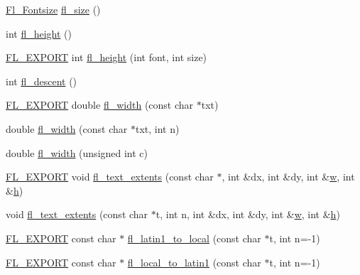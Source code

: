 \begin{DoxyCompactItemize}
\hyperlink{_enumerations_8_h_ad58927f5c691454480f7cd28362502f1}{Fl\+\_\+\+Fontsize} \hyperlink{group__fl__attributes_ga15b0cb282ba6d148f095647731f167b2}{fl\+\_\+size} ()
\item 
int \hyperlink{group__fl__attributes_gac4acb828270adf35bf1d8fc06051f938}{fl\+\_\+height} ()
\item 
\hyperlink{_fl___export_8_h_aa9ba29a18aee9d738370a06eeb4470fc}{F\+L\+\_\+\+E\+X\+P\+O\+RT} int \hyperlink{group__fl__attributes_ga287690bb893d1cc57a5010d59b2da8c9}{fl\+\_\+height} (int font, int size)
\item 
int \hyperlink{group__fl__attributes_ga080e029f6b6fe5e6bf527bbfd890317d}{fl\+\_\+descent} ()
\item 
\hyperlink{_fl___export_8_h_aa9ba29a18aee9d738370a06eeb4470fc}{F\+L\+\_\+\+E\+X\+P\+O\+RT} double \hyperlink{group__fl__attributes_ga92c762ce2fc7fa891bac6b7590f967bd}{fl\+\_\+width} (const char $\ast$txt)
\item 
double \hyperlink{group__fl__attributes_gae491dc82c611608435ed434e368ef668}{fl\+\_\+width} (const char $\ast$txt, int n)
\item 
double \hyperlink{group__fl__attributes_ga4a5b5e4a977299acdc7fcbd3c8a700b5}{fl\+\_\+width} (unsigned int c)
\item 
\hyperlink{_fl___export_8_h_aa9ba29a18aee9d738370a06eeb4470fc}{F\+L\+\_\+\+E\+X\+P\+O\+RT} void \hyperlink{group__fl__attributes_ga14cb75a92b6cdd576f9512b38a208f8b}{fl\+\_\+text\+\_\+extents} (const char $\ast$, int \&dx, int \&dy, int \&\hyperlink{forms_8_h_aac374e320caaadeca4874add33b62af2}{w}, int \&\hyperlink{forms_8_h_a7e427ba5b307f9068129699250690066}{h})
\item 
void \hyperlink{group__fl__attributes_gaa52f1ed8201b9d89c2b2edbaed80e907}{fl\+\_\+text\+\_\+extents} (const char $\ast$t, int n, int \&dx, int \&dy, int \&\hyperlink{forms_8_h_aac374e320caaadeca4874add33b62af2}{w}, int \&\hyperlink{forms_8_h_a7e427ba5b307f9068129699250690066}{h})
\item 
\hyperlink{_fl___export_8_h_aa9ba29a18aee9d738370a06eeb4470fc}{F\+L\+\_\+\+E\+X\+P\+O\+RT} const char $\ast$ \hyperlink{group__fl__attributes_ga47015273468749763dcdd97e2aef2c52}{fl\+\_\+latin1\+\_\+to\+\_\+local} (const char $\ast$t, int n=-\/1)
\item 
\hyperlink{_fl___export_8_h_aa9ba29a18aee9d738370a06eeb4470fc}{F\+L\+\_\+\+E\+X\+P\+O\+RT} const char $\ast$ \hyperlink{group__fl__attributes_gab8a87db2004482954fc81a8a41c80c21}{fl\+\_\+local\+\_\+to\+\_\+latin1} (const char $\ast$t, int n=-\/1)
\item 

\end{DoxyCompactItemize}

